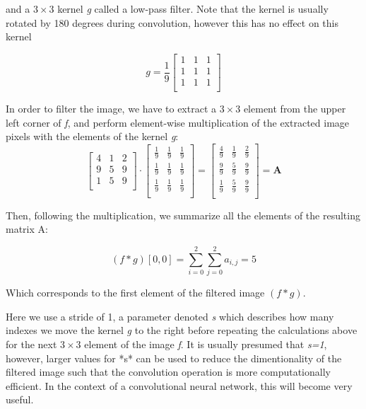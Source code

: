 \documentclass[onecolumn,10pt,cleanfoot]{asme2ej}
\begin{document}
and a $3 \times 3$ kernel \textit{g} called a low-pass filter. Note that the kernel is usually rotated by 180 degrees during convolution, however this has no effect on this kernel

\begin{equation}
g = \frac{1}{9} \begin{bmatrix}
1 & 1 & 1 \\
1 & 1 & 1 \\
1 & 1 & 1 \\
\end{bmatrix}
\end{equation}

In order to filter the image, we have to extract a $3 \times 3$ element from the upper left corner of \textit{f}, and perform element-wise multiplication of the extracted image pixels with the elements of the kernel \textit{g}:
\begin{equation}
\begin{bmatrix}
4 & 1 & 2 \\
9 & 5 & 9 \\
1 & 5 & 9 \\
\end{bmatrix}
\cdot
\begin{bmatrix}
\frac{1}{9} & \frac{1}{9} & \frac{1}{9} \\
\frac{1}{9} & \frac{1}{9} & \frac{1}{9} \\
\frac{1}{9} & \frac{1}{9} & \frac{1}{9} \\
\end{bmatrix}
=
\begin{bmatrix}
\frac{4}{9} & \frac{1}{9} & \frac{2}{9} \\
\frac{9}{9} & \frac{5}{9} & \frac{9}{9} \\
\frac{1}{9} & \frac{5}{9} & \frac{9}{9} \\
\end {bmatrix}
= \textbf{A}
\end{equation}

Then, following the multiplication, we summarize all the elements of the resulting matrix A:

\begin{equation}
(f \ast g)[0, 0] = \sum_{i=0}^{2} \sum_{j=0}^{2} a_{i,j} = 5
\end{equation}

Which corresponds to the first element of the filtered image $(f \ast g)$.

	Here we use a stride of 1, a parameter denoted \textit{s} which describes how many indexes we move the kernel \textit{g} to the right before repeating the calculations above for the next $3 \times 3$ element of the image \textit{f}. It is usually presumed that \textit{s=1}, however, larger values for *s* can be used to reduce the dimentionality of the filtered image such that the convolution operation is more computationally efficient. In the context of a convolutional neural network, this will become very useful.
\end{document}
